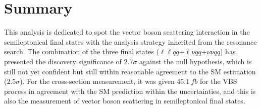 \section{Summary}
This analysis is dedicated to spot the vector boson scattering interaction in the semileptonical final states with the analysis strategy inherited from the resonance search. The combination of the three final states ($\ell\ell qq$+$\ell\nu qq$+$\nu\nu qq$) has presented the discovery significance of $2.7\sigma$  against the null hypothesis, which is still not yet confident but still within reasonable agreement to the SM estimation ($2.5\sigma$). For the cross-section measurement, it was given $45.1~fb$ for the VBS process in agreement with the SM prediction within the uncertainties, and this is also the measurement of vector boson scattering in semileptonical final states. 